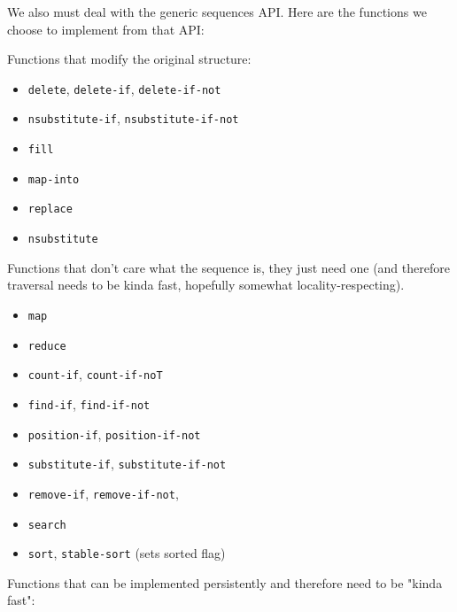 \documentclass[sigconf]{acmart}
\begin{document}
We also must deal with the generic sequences API. Here are the functions we
choose to implement from that API:

Functions that modify the original structure:


\begin{itemize}
    \item \texttt{delete}, \texttt{delete-if}, \texttt{delete-if-not}
    \item \texttt{nsubstitute-if}, \texttt{nsubstitute-if-not}
    \item \texttt{fill}
    \item \texttt{map-into}
    \item \texttt{replace}
    \item \texttt{nsubstitute}
\end{itemize}

Functions that don't care what the sequence is, they just need one (and
therefore traversal needs to be kinda fast, hopefully somewhat
locality-respecting).

\begin{itemize}
    \item \texttt{map}
    \item \texttt{reduce}
    \item \texttt{count-if}, \texttt{count-if-noT}
    \item \texttt{find-if}, \texttt{find-if-not}
    \item \texttt{position-if}, \texttt{position-if-not}
    \item \texttt{substitute-if}, \texttt{substitute-if-not}
    \item \texttt{remove-if}, \texttt{remove-if-not},
    \item \texttt{search}
    \item \texttt{sort}, \texttt{stable-sort} (sets sorted flag)
\end{itemize}

Functions that can be implemented persistently and therefore need to be "kinda
fast":
\end{document}
